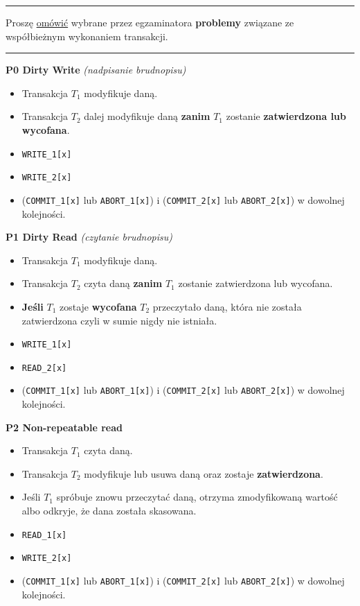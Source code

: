 \documentclass[a5paper,6pt]{article}
\newcommand{\horrule}[1]{\rule{\linewidth}{#1}}
\begin{document}
\pagebreak

    \horrule{0.5pt}
    Proszę \underline{omówić} wybrane przez egzaminatora \textbf{problemy}
    związane ze współbieżnym wykonaniem transakcji.\\
    \horrule{0.5pt}

    \textbf{P0 Dirty Write} \textit{(nadpisanie brudnopisu)}
    \begin{itemize}
        \item Transakcja $T_1$ modyfikuje daną.
        \item Transakcja $T_2$ dalej modyfikuje daną \textbf{zanim} $T_1$
              zostanie \textbf{zatwierdzona lub wycofana}.
        \item \texttt{WRITE\_1[x]}
        \item \texttt{WRITE\_2[x]}
        \item (\texttt{COMMIT\_1[x]} lub \texttt{ABORT\_1[x]}) i
              (\texttt{COMMIT\_2[x]} lub \texttt{ABORT\_2[x]})
              w dowolnej kolejności.
    \end{itemize}

    \textbf{P1 Dirty Read} \textit{(czytanie brudnopisu)}
    \begin{itemize}
        \item Transakcja $T_1$ modyfikuje daną.
        \item Transakcja $T_2$ czyta daną \textbf{zanim} $T_1$ zostanie
              zatwierdzona lub wycofana.
        \item \textbf{Jeśli} $T_1$ zostaje \textbf{wycofana} $T_2$ przeczytało
              daną, która nie została zatwierdzona czyli w sumie nigdy nie
              istniała.
        \item \texttt{WRITE\_1[x]}
        \item \texttt{READ\_2[x]}
        \item (\texttt{COMMIT\_1[x]} lub \texttt{ABORT\_1[x]}) i
              (\texttt{COMMIT\_2[x]} lub \texttt{ABORT\_2[x]})
              w dowolnej kolejności.
    \end{itemize}

    \textbf{P2 Non-repeatable read}
    \begin{itemize}
        \item Transakcja $T_1$ czyta daną.
        \item Transakcja $T_2$ modyfikuje lub usuwa daną oraz zostaje
              \textbf{zatwierdzona}.
        \item Jeśli $T_1$ spróbuje znowu przeczytać daną, otrzyma zmodyfikowaną
              wartość albo odkryje, że dana została skasowana.
        \item \texttt{READ\_1[x]}
        \item \texttt{WRITE\_2[x]}
        \item (\texttt{COMMIT\_1[x]} lub \texttt{ABORT\_1[x]}) i
              (\texttt{COMMIT\_2[x]} lub \texttt{ABORT\_2[x]})
              w dowolnej kolejności.
    \end{itemize}
\end{document}
